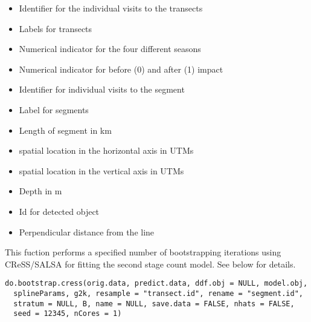 \documentclass[a4paper]{book}
\begin{document}
\begin{Details}\relax
\begin{itemize}

\item {} Identifier for the individual visits to the transects
\item {} Labels for transects
\item {} Numerical indicator for the four different seasons
\item {} Numerical indicator for before (0) and after (1) impact
\item {} Identifier for individual visits to the segment
\item {} Label for segments
\item {} Length of segment in km
\item {} spatial location in the horizontal axis in UTMs
\item {} spatial location in the vertical axis in UTMs
\item {} Depth in m
\item {} Id for detected object      
\item {} Perpendicular distance from the line

\end{itemize}

\end{Details}
%
\begin{Description}\relax
This fuction performs a specified number of bootstrapping iterations using CReSS/SALSA for fitting the 
second stage count model. See below for details.
\end{Description}
%
\begin{Usage}
\begin{verbatim}
do.bootstrap.cress(orig.data, predict.data, ddf.obj = NULL, model.obj,
  splineParams, g2k, resample = "transect.id", rename = "segment.id",
  stratum = NULL, B, name = NULL, save.data = FALSE, nhats = FALSE,
  seed = 12345, nCores = 1)
\end{verbatim}
\end{Usage}
%
\end{document}
